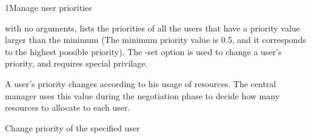 \begin{ManPage}{}{1}{Manage user priorities} 
\label{man-condor-userprio}
\Synopsis {}

\Description 
{} with no arguments, lists the priorities of all
the users that have a priority value larger than the minimum (The minimum
priority value is 0.5, and it corresponds to the highest possible
priority). The -set option is used to change a user's priority, and requires
special privilage.

A user's priority changes according to his usage of resources. The central
manager uses this value during the negotiation phase to decide how many
resources to allocate to each user.

\begin{Options}


	{Change priority of the specified user}
\end{Options}

\end{ManPage}
